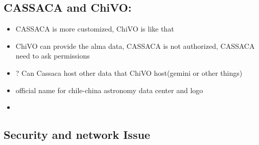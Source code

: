 \documentclass[11pt]{article}
\begin{document}
\subsection{CASSACA and ChiVO:}
\label{sec-1-3}
\begin{itemize}
\item CASSACA is more customized, ChiVO is like that
\item ChiVO can provide the alma data, CASSACA is not authorized, CASSACA need to ask permissions
\item ? Can Cassaca host other data that ChiVO host(gemini or other things)
\item official name for chile-china astronomy data center and logo
\item 
\end{itemize}

\subsection{Security and network Issue}
\label{sec-1-4}
\end{document}

